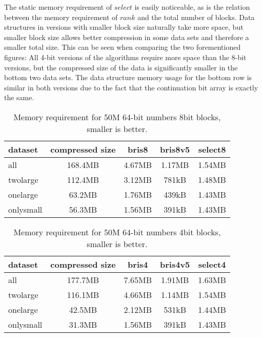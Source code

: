 The static memory requirement of $select$ is easily noticeable, 
as is the relation between the memory requirement of $rank$ and the total number of blocks. Data structures in versions with smaller block size naturally take more space, but smaller block 
size allows better compression in some data sets and therefore a smaller total size. This can be seen when comparing the two forementioned figures: All 4-bit versions of the algorithms require
more space than the 8-bit versions, but the compressed size of the data is significantly smaller in the bottom two data sets. The data structure memory usage for the bottom row is similar in both versions 
due to the fact that the continuation bit array is exactly the same.




\begin{table}
\centering
\begin{tabular}{l|| c c c c } 
dataset   & compressed size & bris8  & bris8v5 & select8  \\
 \hline \hline 
all       & 168.4MB         & 4.67MB & 1.17MB   & 1.54MB    \\
twolarge  & 112.4MB         & 3.12MB & 781kB    & 1.48MB    \\
onelarge  &  63.2MB         & 1.76MB & 439kB    & 1.43MB    \\
onlysmall &  56.3MB         & 1.56MB & 391kB    & 1.43MB    \\


\hline
%
\end{tabular}
\caption{Memory requirement for 50M 64-bit numbers 8bit blocks, smaller is better.\label{table:results8bit}}
\end{table}

\begin{table}
\centering
\begin{tabular}{l|| c c c c } 
dataset   & compressed size & bris4  & bris4v5 & select4  \\
 \hline \hline 
all       & 177.7MB         & 7.65MB & 1.91MB  & 1.63MB \\
twolarge  & 116.1MB         & 4.66MB & 1.14MB  & 1.54MB \\
onelarge  & 42.5MB          & 2.12MB & 531kB   & 1.44MB \\
onlysmall & 31.3MB          & 1.56MB & 391kB   & 1.43MB \\


\hline
%
\end{tabular}
\caption{Memory requirement for 50M 64-bit numbers 4bit blocks, smaller is better.\label{table:results4bit}}
\end{table}

